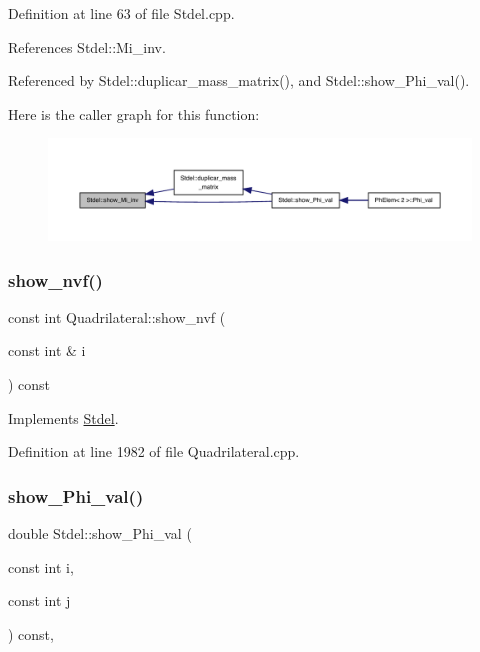 Definition at line 63 of file Stdel.\+cpp.



References Stdel\+::\+Mi\+\_\+inv.



Referenced by Stdel\+::duplicar\+\_\+mass\+\_\+matrix(), and Stdel\+::show\+\_\+\+Phi\+\_\+val().

Here is the caller graph for this function\+:
\nopagebreak
\begin{figure}[H]
\begin{center}
\leavevmode
\includegraphics[width=350pt]{classStdel_a11bf2897170ada9a9dd8f641a39585e5_icgraph}
\end{center}
\end{figure}
\mbox{\label{classQuadrilateral_a1ee9b57112c7d840338d7326e4d86ffc}} 
\subsubsection{\texorpdfstring{show\+\_\+nvf()}{show\_nvf()}}
{\footnotesize\ttfamily const int Quadrilateral\+::show\+\_\+nvf (\begin{DoxyParamCaption}\item[{const int \&}]{i }\end{DoxyParamCaption}) const\hspace{0.3cm}{\ttfamily [virtual]}}



Implements \hyperlink{classStdel_a2a504322269a749dd3c443d0e86c4a6c}{Stdel}.



Definition at line 1982 of file Quadrilateral.\+cpp.

\mbox{\label{classStdel_a6565c36150823a1f52a2daf05806f7a4}} 
\subsubsection{\texorpdfstring{show\+\_\+\+Phi\+\_\+val()}{show\_Phi\_val()}}
{\footnotesize\ttfamily double Stdel\+::show\+\_\+\+Phi\+\_\+val (\begin{DoxyParamCaption}\item[{const int}]{i,  }\item[{const int}]{j }\end{DoxyParamCaption}) const\hspace{0.3cm}{\ttfamily [inline]}, {\ttfamily [inherited]}}



